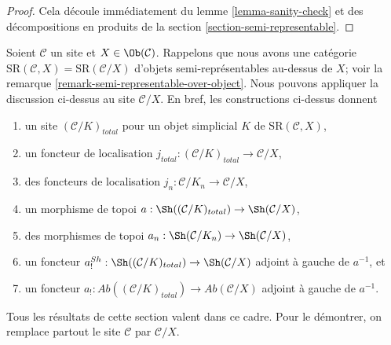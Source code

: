 \begin{proof}
Cela découle immédiatement du lemme \ref{lemma-sanity-check}
et des décompositions en produits de la section \ref{section-semi-representable}.
\end{proof}

\begin{remark}
\label{remark-augmentation-over-object}
Soient $\mathcal{C}$ un site et $X \in \Ob(\mathcal{C})$.
Rappelons que nous avons une catégorie
$\text{SR}(\mathcal{C}, X) = \text{SR}(\mathcal{C}/X)$
d'objets semi-représentables au-dessus de $X$;
voir la remarque \ref{remark-semi-representable-over-object}.
Nous pouvons appliquer la discussion ci-dessus au site
$\mathcal{C}/X$. En bref, les constructions ci-dessus donnent
\begin{enumerate}
\item un site $(\mathcal{C}/K)_{total}$ pour un objet simplicial $K$
de $\text{SR}(\mathcal{C}, X)$,
\item un foncteur de localisation
$j_{total} : (\mathcal{C}/K)_{total} \to \mathcal{C}/X$,
\item des foncteurs de localisation $j_n : \mathcal{C}/K_n \to \mathcal{C}/X$,
\item un morphisme de topoi
$a : \Sh((\mathcal{C}/K)_{total}) \to \Sh(\mathcal{C}/X)$,
\item des morphismes de topoi
$a_n : \Sh(\mathcal{C}/K_n) \to \Sh(\mathcal{C}/X)$,
\item un foncteur
$a^{Sh}_! : \Sh((\mathcal{C}/K)_{total}) \to \Sh(\mathcal{C}/X)$
adjoint à gauche de $a^{-1}$, et
\item un foncteur
$a_! : \textit{Ab}((\mathcal{C}/K)_{total}) \to \textit{Ab}(\mathcal{C}/X)$
adjoint à gauche de $a^{-1}$.
\end{enumerate}
Tous les résultats de cette section valent dans ce cadre.
Pour le démontrer, on remplace partout
le site $\mathcal{C}$ par $\mathcal{C}/X$.
\end{remark}

